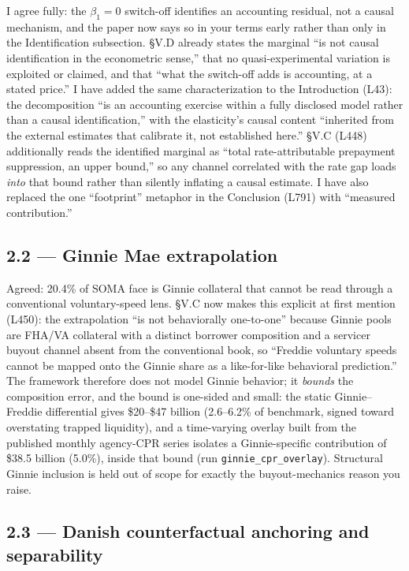 \documentclass[11pt]{article}
\newcommand{\run}[1]{\texttt{#1}}
\begin{document}
I agree fully: the $\beta_1 = 0$ switch-off identifies an accounting residual,
not a causal mechanism, and the paper now says so in your terms early rather
than only in the Identification subsection. \S V.D already states the marginal
``is not causal identification in the econometric sense,'' that no
quasi-experimental variation is exploited or claimed, and that ``what the
switch-off adds is accounting, at a stated price.'' I have added the same
characterization to the Introduction (L43): the decomposition ``is an
accounting exercise within a fully disclosed model rather than a causal
identification,'' with the elasticity's causal content ``inherited from the
external estimates that calibrate it, not established here.'' \S V.C (L448)
additionally reads the identified marginal as ``total rate-attributable
prepayment suppression, an upper bound,'' so any channel correlated with the
rate gap loads \emph{into} that bound rather than silently inflating a causal
estimate. I have also replaced the one ``footprint'' metaphor in the Conclusion
(L791) with ``measured contribution.''

\subsection*{2.2 --- Ginnie Mae extrapolation}

Agreed: 20.4\% of SOMA face is Ginnie collateral that cannot be read through a
conventional voluntary-speed lens. \S V.C now makes this explicit at first
mention (L450): the extrapolation ``is not behaviorally one-to-one'' because
Ginnie pools are FHA/VA collateral with a distinct borrower composition and a
servicer buyout channel absent from the conventional book, so ``Freddie
voluntary speeds cannot be mapped onto the Ginnie share as a like-for-like
behavioral prediction.'' The framework therefore does not model Ginnie
behavior; it \emph{bounds} the composition error, and the bound is one-sided
and small: the static Ginnie--Freddie differential gives \$20--\$47 billion
(2.6--6.2\% of benchmark, signed toward overstating trapped liquidity), and a
time-varying overlay built from the published monthly agency-CPR series
isolates a Ginnie-specific contribution of \$38.5 billion (5.0\%), inside that
bound (run \run{ginnie\_cpr\_overlay}). Structural Ginnie inclusion is held out
of scope for exactly the buyout-mechanics reason you raise.

\subsection*{2.3 --- Danish counterfactual anchoring and separability}
\end{document}
